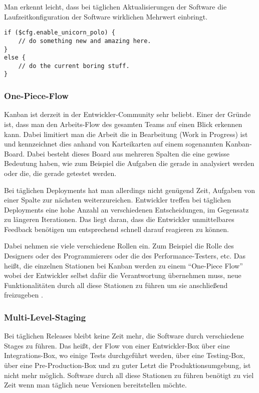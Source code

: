 Man erkennt leicht, dass bei täglichen Aktualisierungen der Software die Laufzeitkonfiguration der Software wirklichen Mehrwert einbringt.

\begin{lstlisting}[float=h!tb,caption=Beispiel eines Feature Flags bei Flickr \cite{flickr09}, label=fflagcode]
if ($cfg.enable_unicorn_polo) {
    // do something new and amazing here.
}
else {
    // do the current boring stuff.
}
\end{lstlisting}

\subsubsection{One-Piece-Flow}
Kanban ist derzeit in der Entwickler-Community sehr beliebt. Einer der Gründe ist, dass man den Arbeits-Flow des gesamten Teams auf einen Blick erkennen kann. Dabei limitiert man die Arbeit die in Bearbeitung (Work in Progress) ist und kennzeichnet dies anhand von Karteikarten auf einem sogenannten Kanban-Board. Dabei besteht dieses Board aus mehreren Spalten die eine gewisse Bedeutung haben, wie zum Beispiel die Aufgaben die gerade in analysiert werden oder die, die gerade getestet werden. 

Bei täglichen Deployments hat man allerdings nicht genügend Zeit, Aufgaben von einer Spalte zur nächsten weiterzureichen. Entwickler treffen bei täglichen Deployments eine hohe Anzahl an verschiedenen Entscheidungen, im Gegensatz zu längeren Iterationen. Das liegt daran, dass die Entwickler unmittelbares Feedback benötigen um entsprechend schnell darauf reagieren zu können.

Dabei nehmen sie viele verschiedene Rollen ein. Zum Beispiel die Rolle des Designers oder des Programmierers oder die des Performance-Testers, etc. Das heißt, die einzelnen Stationen bei Kanban werden zu einem \enquote{One-Piece Flow} wobei der Entwickler selbst dafür die Verantwortung übernehmen muss, neue Funktionalitäten durch all diese Stationen zu führen um sie anschließend freizugeben \cite{sutherland2011}.

\subsubsection{Multi-Level-Staging}
Bei täglichen Releases bleibt keine Zeit mehr, die Software durch verschiedene Stages zu führen. Das heißt, der Flow von einer Entwickler-Box über eine Integrations-Box, wo einige Tests durchgeführt werden, über eine Testing-Box, über eine Pre-Production-Box und zu guter Letzt die Produktionsumgebung, ist nicht mehr möglich. Software durch all diese Stationen zu führen benötigt zu viel Zeit wenn man täglich neue Versionen bereitstellen möchte. 

